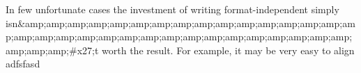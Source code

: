 
In few unfortunate cases the investment of writing format-independent \latex simply isn&amp;amp;amp;amp;amp;amp;amp;amp;amp;amp;amp;amp;amp;amp;amp;amp;amp;amp;amp;amp;amp;amp;amp;amp;amp;amp;amp;amp;amp;amp;amp;amp;amp;amp;amp;#x27;t worth the result. For example, it may be very easy to align adfsfasd
